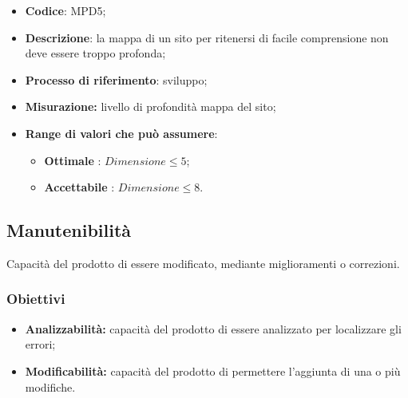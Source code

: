 \vspace{-1cm}
\begin{itemize}
	\item \textbf{Codice}: MPD5;
	\item \textbf{Descrizione}: la mappa di un sito per ritenersi di facile comprensione non deve essere troppo profonda;
	\item \textbf{Processo di riferimento}: sviluppo;
	\item \textbf{Misurazione:} livello di profondità mappa del sito;
	\item \textbf{Range di valori che può assumere}: 
		\begin{itemize}
			\item \textbf{Ottimale} : $Dimensione \leq5$;
			\item \textbf{Accettabile} : $Dimensione \leq8$.
		\end{itemize}
\end{itemize}
\subsection{Manutenibilità}
Capacità del prodotto di essere modificato, mediante miglioramenti o correzioni.
\subsubsection{Obiettivi}
\begin{itemize}
	\item \textbf{Analizzabilità:} capacità del prodotto di essere analizzato per localizzare gli errori;
	\item \textbf{Modificabilità:} capacità del prodotto di permettere l'aggiunta di una o più modifiche.
\end{itemize}
